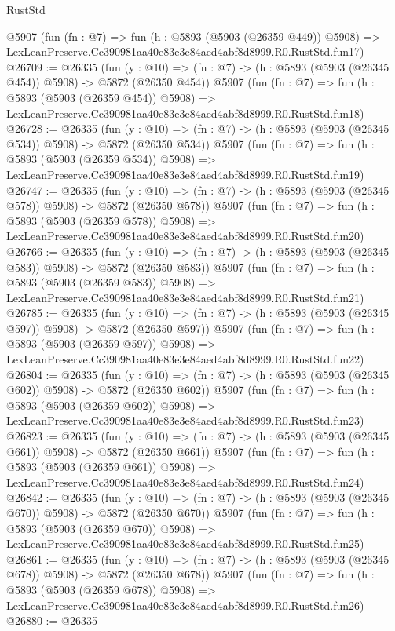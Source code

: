 \begin{lexlean}{RustStd}
\begin{coremodule}
    @5907
    (fun (fn : @7) =>
    fun (h : @5893 (@5903 (@26359 @449)) @5908) =>
    LexLeanPreserve.Cc390981aa40e83e3e84aed4abf8d8999.R0.RustStd.fun17)
@26709 := @26335
    (fun (y : @10) => (fn : @7) -> (h : @5893 (@5903 (@26345 @454)) @5908) -> @5872 (@26350 @454))
    @5907
    (fun (fn : @7) =>
    fun (h : @5893 (@5903 (@26359 @454)) @5908) =>
    LexLeanPreserve.Cc390981aa40e83e3e84aed4abf8d8999.R0.RustStd.fun18)
@26728 := @26335
    (fun (y : @10) => (fn : @7) -> (h : @5893 (@5903 (@26345 @534)) @5908) -> @5872 (@26350 @534))
    @5907
    (fun (fn : @7) =>
    fun (h : @5893 (@5903 (@26359 @534)) @5908) =>
    LexLeanPreserve.Cc390981aa40e83e3e84aed4abf8d8999.R0.RustStd.fun19)
@26747 := @26335
    (fun (y : @10) => (fn : @7) -> (h : @5893 (@5903 (@26345 @578)) @5908) -> @5872 (@26350 @578))
    @5907
    (fun (fn : @7) =>
    fun (h : @5893 (@5903 (@26359 @578)) @5908) =>
    LexLeanPreserve.Cc390981aa40e83e3e84aed4abf8d8999.R0.RustStd.fun20)
@26766 := @26335
    (fun (y : @10) => (fn : @7) -> (h : @5893 (@5903 (@26345 @583)) @5908) -> @5872 (@26350 @583))
    @5907
    (fun (fn : @7) =>
    fun (h : @5893 (@5903 (@26359 @583)) @5908) =>
    LexLeanPreserve.Cc390981aa40e83e3e84aed4abf8d8999.R0.RustStd.fun21)
@26785 := @26335
    (fun (y : @10) => (fn : @7) -> (h : @5893 (@5903 (@26345 @597)) @5908) -> @5872 (@26350 @597))
    @5907
    (fun (fn : @7) =>
    fun (h : @5893 (@5903 (@26359 @597)) @5908) =>
    LexLeanPreserve.Cc390981aa40e83e3e84aed4abf8d8999.R0.RustStd.fun22)
@26804 := @26335
    (fun (y : @10) => (fn : @7) -> (h : @5893 (@5903 (@26345 @602)) @5908) -> @5872 (@26350 @602))
    @5907
    (fun (fn : @7) =>
    fun (h : @5893 (@5903 (@26359 @602)) @5908) =>
    LexLeanPreserve.Cc390981aa40e83e3e84aed4abf8d8999.R0.RustStd.fun23)
@26823 := @26335
    (fun (y : @10) => (fn : @7) -> (h : @5893 (@5903 (@26345 @661)) @5908) -> @5872 (@26350 @661))
    @5907
    (fun (fn : @7) =>
    fun (h : @5893 (@5903 (@26359 @661)) @5908) =>
    LexLeanPreserve.Cc390981aa40e83e3e84aed4abf8d8999.R0.RustStd.fun24)
@26842 := @26335
    (fun (y : @10) => (fn : @7) -> (h : @5893 (@5903 (@26345 @670)) @5908) -> @5872 (@26350 @670))
    @5907
    (fun (fn : @7) =>
    fun (h : @5893 (@5903 (@26359 @670)) @5908) =>
    LexLeanPreserve.Cc390981aa40e83e3e84aed4abf8d8999.R0.RustStd.fun25)
@26861 := @26335
    (fun (y : @10) => (fn : @7) -> (h : @5893 (@5903 (@26345 @678)) @5908) -> @5872 (@26350 @678))
    @5907
    (fun (fn : @7) =>
    fun (h : @5893 (@5903 (@26359 @678)) @5908) =>
    LexLeanPreserve.Cc390981aa40e83e3e84aed4abf8d8999.R0.RustStd.fun26)
@26880 := @26335

\end{coremodule}
\end{lexlean}
